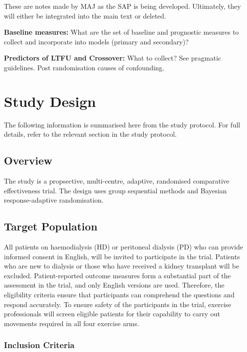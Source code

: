 \documentclass[
]{article}
\begin{document}
These are notes made by MAJ as the SAP is being developed.
Ultimately, they will either be integrated into the main text or deleted.

\textbf{Baseline measures:} What are the set of baseline and prognostic measures to collect and incorporate into models (primary and secondary)?

\textbf{Predictors of LTFU and Crossover:} What to collect?
See pragmatic guidelines.
Post randomisation causes of confounding.


\clearpage

\hypertarget{study-design}{%
  \section{Study Design}\label{study-design}}

The following information is summarised here from the study protocol.
For full details, refer to the relevant section in the study protocol.

\hypertarget{overview}{
  \subsection{Overview}\label{overview}}

The study is a propsective, multi-centre, adaptive, randomised comparative effectiveness trial.
The design uses group sequential methods and Bayesian response-adaptive randomisation.


\hypertarget{target-population}{%
  \subsection{Target Population}\label{target-population}}

All patients on haemodialysis (HD) or peritoneal dialysis (PD) who can provide informed consent in English, will be invited to participate in the trial.
Patients who are new to dialysis or those who have received a kidney transplant will be excluded.
Patient-reported outcome measures form a substantial part of the assessment in the trial, and only English versions are used.
Therefore, the eligibility criteria ensure that participants can comprehend the questions and respond accurately.
To ensure safety of the participants in the trial, exercise professionals will screen eligible patients for their capability to carry out movements required in all four exercise arms.

\hypertarget{inclusion-criteria}{
  \subsubsection{Inclusion Criteria}\label{inclusion-criteria}
}
\end{document}
